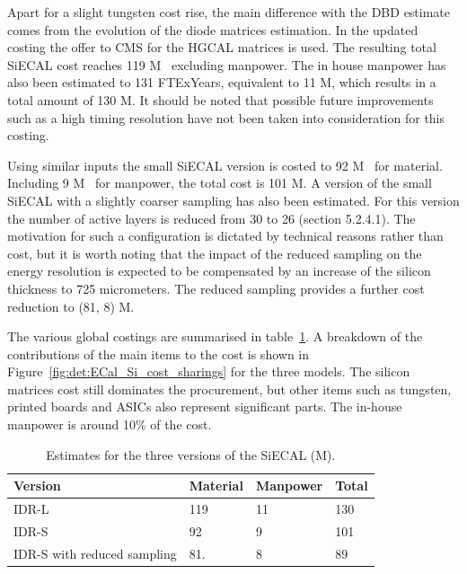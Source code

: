 Apart for a slight tungsten cost rise, the main difference with the DBD estimate comes from the evolution of the diode matrices estimation. In the updated costing the offer to CMS for the HGCAL matrices is used. The resulting total SiECAL cost reaches 119 M\texteuro~ excluding manpower. The in house manpower has also been estimated to 131 FTExYears, equivalent to 11 M\texteuro, which results in a total amount of 130 M\texteuro. It should be noted that possible future improvements such as a high timing resolution have not been taken into consideration for this costing.

Using similar inputs the small SiECAL version is costed to 92 M\texteuro~ for material. Including 9 M\texteuro~ for manpower, the total cost is 101 M\texteuro. 
A version of the small SiECAL with a slightly coarser sampling has also been estimated. For this version the number of active layers is reduced from 30 to 26 (section 5.2.4.1). The motivation for such a configuration is dictated by technical reasons rather than cost, but it is worth noting that the impact of the reduced sampling on the energy resolution is expected to be compensated by an increase of the silicon thickness to 725 micrometers. The reduced sampling provides a further cost reduction to (81, 8) M\texteuro.  

The various global costings are summarised in table~\ref{ECal_summary}. A breakdown of the contributions of the main items to the cost is shown in Figure~\ref{fig:det:ECal_Si_cost_sharings} for the three models. The silicon matrices cost still dominates the procurement, but other items such as tungsten, printed boards and ASICs also represent significant parts. The in-house manpower is around 10\% of the cost.

\begin{table}\hspace*{-0cm}\small 
\begin{tabular}[h!]{ l p{0.2\hsize}p{0.2\hsize}p{0.2\hsize} }
\toprule
Version& Material & Manpower & Total \\
\midrule
IDR-L                       & 119   & 11    & 130   \\
IDR-S                       & 92    &  9    & 101   \\
IDR-S with reduced sampling & 81.   &  8    & 89  \\
\bottomrule
\end{tabular}
\caption{\label{ECal_summary}Estimates for the three versions of the SiECAL (M\texteuro).}
\end{table}

